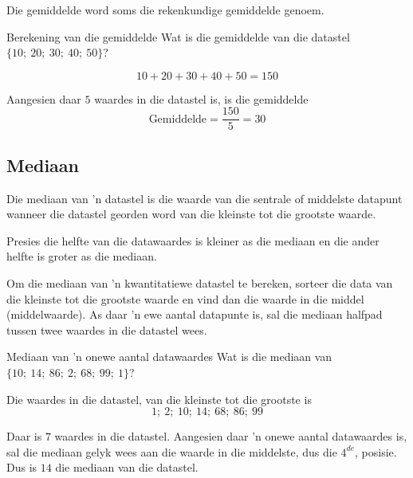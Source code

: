 Die gemiddelde word soms die rekenkundige gemiddelde genoem.
\par
{}

\begin{wex}{Berekening van die gemiddelde}
{Wat is die gemiddelde van die datastel $\{10;\ 20;\ 30;\ 40;\ 50\}$?}
{
  \begin{equation*}
    10 + 20 + 30 + 40 + 50 = 150
  \end{equation*}


  Aangesien daar $5$ waardes in die datastel is, is die gemiddelde
  \begin{equation*}
    \mbox{Gemiddelde} = \frac{150}{5} = 30
  \end{equation*}
}
\end{wex}

\subsection{Mediaan}
{Die mediaan van 'n datastel is die waarde van die sentrale of middelste datapunt wanneer die datastel georden word van die kleinste tot die grootste waarde.}

Presies die helfte van die datawaardes is kleiner as die mediaan en die ander helfte is groter as die mediaan.\par

Om die mediaan van 'n kwantitatiewe datastel te bereken, sorteer die data van die kleinste tot die grootste waarde en vind dan die waarde in die middel (middelwaarde). As daar 'n ewe aantal datapunte is, sal die mediaan halfpad tussen twee waardes in die datastel wees.

\begin{wex}{Mediaan van 'n onewe aantal datawaardes}
{Wat is die mediaan van $\{10;\ 14;\ 86;\ 2;\ 68;\ 99;\ 1\}$?}
{

  Die waardes in die datastel, van die kleinste tot die grootste is
  \begin{equation*}
    1;\ 2;\ 10;\ 14;\ 68;\ 86;\ 99
  \end{equation*}


  Daar is $7$ waardes in die datastel. Aangesien daar 'n onewe aantal datawaardes is, sal die mediaan gelyk wees aan die waarde in die middelste, dus die $4^{de}$, posisie. Dus is $14$ die mediaan van die datastel.
}
\end{wex}

